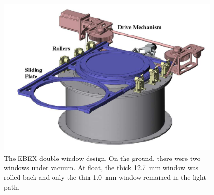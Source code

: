 \begin{figure}[htbp]
\begin{center}
\includegraphics[height=3.2in]{figures/double_window.png}
\caption[EBEX double window]{The \ac{EBEX} double window design. On the ground, there were two windows under vacuum. At float, the thick 12.7~mm window was rolled back and only the thin 1.0~mm window remained in the light path. \cite{Zilic2014}
\label{fig:double_window} }
\end{center}
\end{figure}

